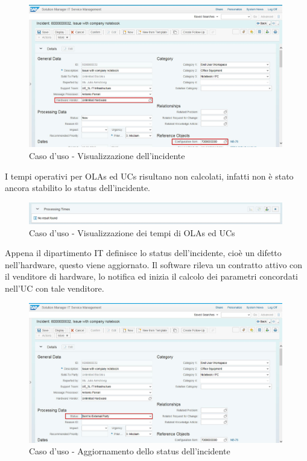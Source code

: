 \begin{figure}[H]
\centering
\includegraphics[width=30em]{immagini/sla/sm1.png}
\caption{Caso d'uso - Visualizzazione dell'incidente}
\end{figure}

I tempi operativi per OLAs ed UCs risultano non calcolati, infatti non è stato ancora stabilito lo status dell'incidente.

\begin{figure}[H]
\centering
\includegraphics[width=30em]{immagini/sla/sm2.png}
\caption{Caso d'uso - Visualizzazione dei tempi di OLAs ed UCs}
\end{figure}

Appena il dipartimento IT definisce lo status dell'incidente, cioè un difetto nell'hardware, questo viene aggiornato. Il software rileva un contratto attivo con il venditore di hardware, lo notifica ed inizia il calcolo dei parametri concordati nell'UC con tale venditore.

\begin{figure}[H]
\centering
\includegraphics[width=30em]{immagini/sla/sm3.png}
\caption{Caso d'uso - Aggiornamento dello status dell'incidente}
\end{figure}

